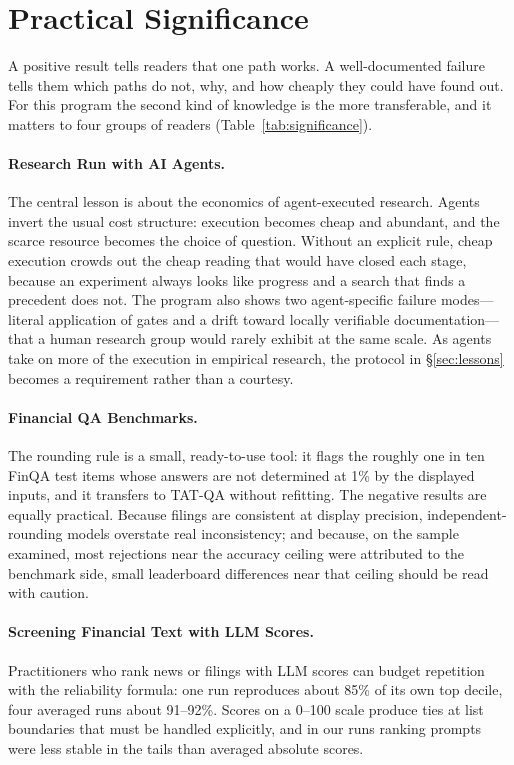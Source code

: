 \documentclass[11pt]{article}
\begin{document}
\section{Practical Significance}
\label{sec:significance}

A positive result tells readers that one path works. A well-documented failure tells them which paths do not, why, and how cheaply they could have found out. For this program the second kind of knowledge is the more transferable, and it matters to four groups of readers (Table~\ref{tab:significance}).

\paragraph{Research Run with AI Agents.} The central lesson is about the economics of agent-executed research. Agents invert the usual cost structure: execution becomes cheap and abundant, and the scarce resource becomes the choice of question. Without an explicit rule, cheap execution crowds out the cheap reading that would have closed each stage, because an experiment always looks like progress and a search that finds a precedent does not. The program also shows two agent-specific failure modes---literal application of gates and a drift toward locally verifiable documentation---that a human research group would rarely exhibit at the same scale. As agents take on more of the execution in empirical research, the protocol in \S\ref{sec:lessons} becomes a requirement rather than a courtesy.

\paragraph{Financial QA Benchmarks.} The rounding rule is a small, ready-to-use tool: it flags the roughly one in ten FinQA test items whose answers are not determined at 1\% by the displayed inputs, and it transfers to TAT-QA without refitting. The negative results are equally practical. Because filings are consistent at display precision, independent-rounding models overstate real inconsistency; and because, on the sample examined, most rejections near the accuracy ceiling were attributed to the benchmark side, small leaderboard differences near that ceiling should be read with caution.

\paragraph{Screening Financial Text with LLM Scores.} Practitioners who rank news or filings with LLM scores can budget repetition with the reliability formula: one run reproduces about 85\% of its own top decile, four averaged runs about 91--92\%. Scores on a 0--100 scale produce ties at list boundaries that must be handled explicitly, and in our runs ranking prompts were less stable in the tails than averaged absolute scores.
\end{document}
